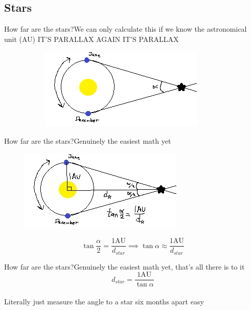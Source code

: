 \documentclass[12pt]{beamer}
\begin{document}
    \subsection{Stars}
        \begin{frame}{How far are the stars?}{We can only calculate this if we know the astronomical unit (AU)} \centering
            IT'S PARALLAX AGAIN IT'S PARALLAX
            \begin{figure}
                \begin{figure}
                    \includegraphics{stellarparallaxdiagram.png}
                \end{figure}
            \end{figure}
        \end{frame}
        \begin{frame}{How far are the stars?}{Genuinely the easiest math yet} \centering
            \begin{figure}
                \includegraphics{stellarparallaxdiagram2.jpg}
            \end{figure}
            \[\tan{\frac{\alpha}{2}}=\frac{\mathrm{1AU}}{d_{star}} \implies \tan{\alpha}\approx\frac{\mathrm{1AU}}{d_{star}}\]
        \end{frame}
        \begin{frame}{How far are the stars?}{Genuinely the easiest math yet, that's all there is to it} \centering
            \[d_{star}=\frac{\mathrm{1AU}}{\tan{\alpha}}\] \\ \vspace{1em}
            Literally just measure the angle to a star six months apart easy
        \end{frame}
\end{document}
